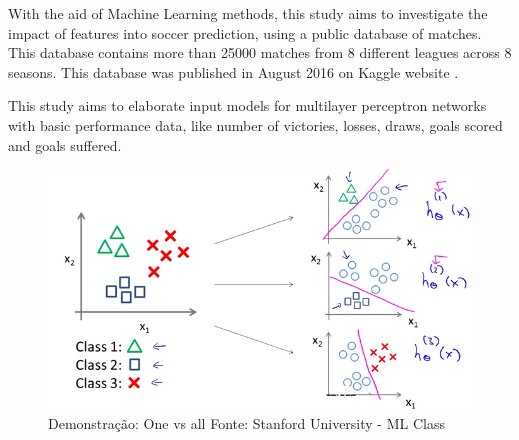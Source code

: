 \documentclass{article}
\begin{document}
With the aid of Machine Learning methods, this study aims to investigate the impact of features into  soccer prediction, using a public database of matches. This database contains more than 25000 matches from 8 different leagues across 8 seasons. This database was published in August 2016 on Kaggle website \cite{kaggledatabase}.

This study aims to elaborate input models for multilayer perceptron networks
with basic performance data, like number of victories, losses, draws, goals
scored and goals suffered.
		
		\begin{figure}[ht]
			\vskip 0.2in
			\begin{center}
				\centerline{\includegraphics[width=\columnwidth]{img/onevsall.jpg}}
				\caption{Demonstração: One vs all Fonte: Stanford University - ML Class}
				\label{fig:onevsall}
			\end{center}
			\vskip -0.2in
			
		\end{figure}
	
\end{document}
